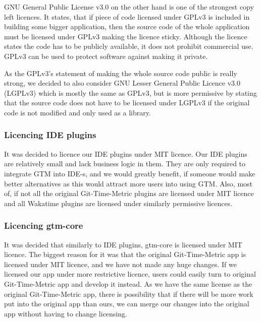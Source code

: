 GNU General Public License v3.0 on the other hand is one of the strongest copy left licences.
It states, that if piece of code licensed under GPLv3 is included in building some bigger application,
then the source code of the whole application must be licensed under GPLv3 making the licence sticky.
Although the licence states the code has to be publicly available, it does not prohibit commercial use.
GPLv3 can be used to protect software against making it private.
\cite{gplv3-licence}

As the GPLv3's statement of making the whole source code public is really strong, we decided to also consider
GNU Lesser General Public Licence v3.0 (LGPLv3) which is mostly the same as GPLv3, but is more permissive by
stating that the source code does not have to be licensed under LGPLv3 if the original code is not modified and only used as a library.
\cite{lgplv3-licence}

\subsubsection{Licencing IDE plugins}\label{subsubsec:licencing-ide-plugins}
It was decided to licence our IDE plugins under MIT licence.
Our IDE plugins are relatively small and lack business logic in them.
They are only required to integrate GTM into IDE-s, and we would greatly benefit, if someone would make better alternatives
as this would attract more users into using GTM.
Also, most of, if not all the original Git-Time-Metric plugins are licensed under MIT licence and all Wakatime plugins are
licensed under similarly permissive licences.

\subsubsection{Licencing gtm-core}\label{subsubsec:licencing-gtm-core}
It was decided that similarly to IDE plugins, gtm-core is licensed under MIT licence.
The biggest reason for it was that the original Git-Time-Metric app is licensed under MIT licence, and we have not made any huge changes.
If we licensed our app under more restrictive licence, users could easily turn to original Git-Time-Metric app and develop it instead.
As we have the same license as the original Git-Time-Metric app, there is possibility that if there will be more work put into the
original app than ours, we can merge our changes into the original app without having to change licensing.

